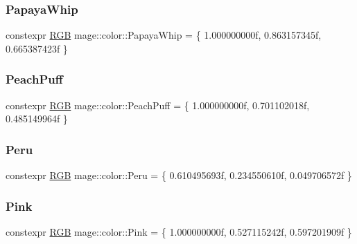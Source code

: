 \hypertarget{namespacemage_1_1color_a209f72744c785cbc48f954bd42b35f79}{}\label{namespacemage_1_1color_a209f72744c785cbc48f954bd42b35f79} 
\subsubsection{\texorpdfstring{Papaya\+Whip}{PapayaWhip}}
{\footnotesize\ttfamily constexpr \hyperlink{structmage_1_1_r_g_b}{R\+GB} mage\+::color\+::\+Papaya\+Whip = \{ 1.\+000000000f, 0.\+863157345f, 0.\+665387423f \}}

\hypertarget{namespacemage_1_1color_a6ec38a42d469de89ab50cd4db3338754}{}\label{namespacemage_1_1color_a6ec38a42d469de89ab50cd4db3338754} 
\subsubsection{\texorpdfstring{Peach\+Puff}{PeachPuff}}
{\footnotesize\ttfamily constexpr \hyperlink{structmage_1_1_r_g_b}{R\+GB} mage\+::color\+::\+Peach\+Puff = \{ 1.\+000000000f, 0.\+701102018f, 0.\+485149964f \}}

\hypertarget{namespacemage_1_1color_a6fada3c18d633306e50b65df7bf6c043}{}\label{namespacemage_1_1color_a6fada3c18d633306e50b65df7bf6c043} 
\subsubsection{\texorpdfstring{Peru}{Peru}}
{\footnotesize\ttfamily constexpr \hyperlink{structmage_1_1_r_g_b}{R\+GB} mage\+::color\+::\+Peru = \{ 0.\+610495693f, 0.\+234550610f, 0.\+049706572f \}}

\hypertarget{namespacemage_1_1color_ae16637717be4ec8fdf6991f24e5ccf27}{}\label{namespacemage_1_1color_ae16637717be4ec8fdf6991f24e5ccf27} 
\subsubsection{\texorpdfstring{Pink}{Pink}}
{\footnotesize\ttfamily constexpr \hyperlink{structmage_1_1_r_g_b}{R\+GB} mage\+::color\+::\+Pink = \{ 1.\+000000000f, 0.\+527115242f, 0.\+597201909f \}}

